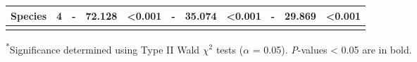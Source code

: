 \begin{landscape}
\begin{table}[]
{\begin{tabular}{p{2.5cm}p{0.5cm}p{2cm}p{1.5cm}p{1.5cm}p{2cm}p{1.5cm}p{1.5cm}p{2cm}p{1.5cm}p{1.5cm}}
                 Species & \multicolumn{1}{r}{4}
                 & \multicolumn{1}{r}{-} & \multicolumn{1}{r}{72.128} &  \multicolumn{1}{r}{\textbf{\textless{}0.001}}
                 & \multicolumn{1}{r}{-} & \multicolumn{1}{r}{35.074} &  \multicolumn{1}{r}{\textbf{\textless{}0.001}}
                 & \multicolumn{1}{r}{-} & \multicolumn{1}{r}{29.869} &  \multicolumn{1}{r}{\textbf{\textless{}0.001}}
                 \\
                 \hline

                 &&&&&&&&&& 
                 \\
    \end{tabular}}
    \label{tab:table3.1}
    \end{table}
    \noindent \textsuperscript{*}Significance determined using Type II Wald $\chi^{2}$ tests ($\alpha$ = 0.05). \textit{P}-values < 0.05 are in bold.
\end{landscape}
\clearpage

